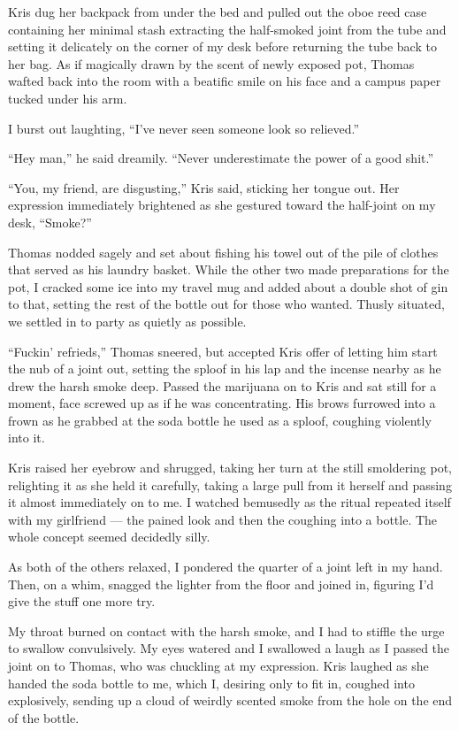 Kris dug her backpack from under the bed and pulled out the oboe reed case containing her minimal stash extracting the half-smoked joint from the tube and setting it delicately on the corner of my desk before returning the tube back to her bag.  As if magically drawn by the scent of newly exposed pot, Thomas wafted back into the room with a beatific smile on his face and a campus paper tucked under his arm.

I burst out laughting, ``I've never seen someone look so relieved.''

``Hey man,'' he said dreamily. ``Never underestimate the power of a good shit.''

``You, my friend, are disgusting,'' Kris said, sticking her tongue out.  Her expression immediately brightened as she gestured toward the half-joint on my desk, ``Smoke?''

Thomas nodded sagely and set about fishing his towel out of the pile of clothes that served as his laundry basket.  While the other two made preparations for the pot, I cracked some ice into my travel mug and added about a double shot of gin to that, setting the rest of the bottle out for those who wanted.  Thusly situated, we settled in to party as quietly as possible.

``Fuckin' refrieds,'' Thomas sneered, but accepted Kris offer of letting him start the nub of a joint out, setting the sploof in his lap and the incense nearby as he drew the harsh smoke deep.  Passed the marijuana on to Kris and sat still for a moment, face screwed up as if he was concentrating.  His brows furrowed into a frown as he grabbed at the soda bottle he used as a sploof, coughing violently into it.

Kris raised her eyebrow and shrugged, taking her turn at the still smoldering pot, relighting it as she held it carefully, taking a large pull from it herself and passing it almost immediately on to me.  I watched bemusedly as the ritual repeated itself with my girlfriend --- the pained look and then the coughing into a bottle.  The whole concept seemed decidedly silly.

As both of the others relaxed, I pondered the quarter of a joint left in my hand.  Then, on a whim, snagged the lighter from the floor and joined in, figuring I'd give the stuff one more try.

My throat burned on contact with the harsh smoke, and I had to stiffle the urge to swallow convulsively.  My eyes watered and I swallowed a laugh as I passed the joint on to Thomas, who was chuckling at my expression.  Kris laughed as she handed the soda bottle to me, which I, desiring only to fit in, coughed into explosively, sending up a cloud of weirdly scented smoke from the hole on the end of the bottle.


